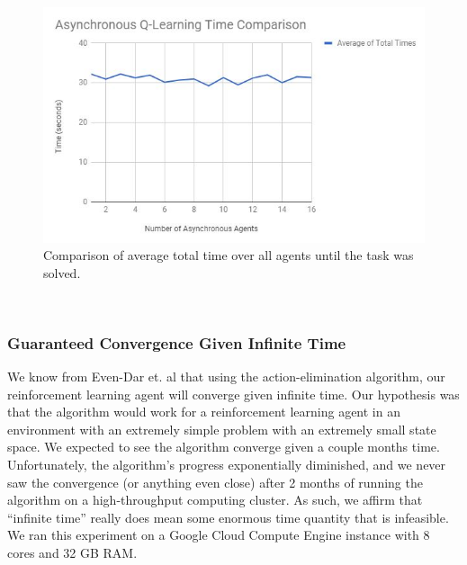 \documentclass[twocolumn]{article}
\begin{document}
	\begin{figure}[!htb]
		\centering
		\includegraphics[width=\linewidth]{AQL-Time.JPG}
		\caption{Comparison of average total time over all agents until the 
		task was solved.}
		\label{fig:AQL-Time}
	\end{figure}\\
	
	\subsubsection*{Guaranteed Convergence Given Infinite Time}
	We know from Even-Dar et. al\cite{Even-Dar} that using the 
	action-elimination algorithm, 
	our reinforcement learning agent will converge given infinite time. Our 
	hypothesis was that the algorithm would work for a reinforcement learning 
	agent in an environment with an extremely simple problem with an extremely 
	small state space. We expected to see the algorithm converge given a couple 
	months time. Unfortunately, the algorithm's progress exponentially 
	diminished, and we never saw the convergence (or anything even close) after 
	2 months of running the algorithm on a high-throughput computing cluster. 
	As such, we affirm that ``infinite time'' really does mean some enormous 
	time quantity that is infeasible. We ran this experiment on a Google Cloud 
	Compute Engine instance with 8 cores and 32 GB RAM.\\
\end{document}
